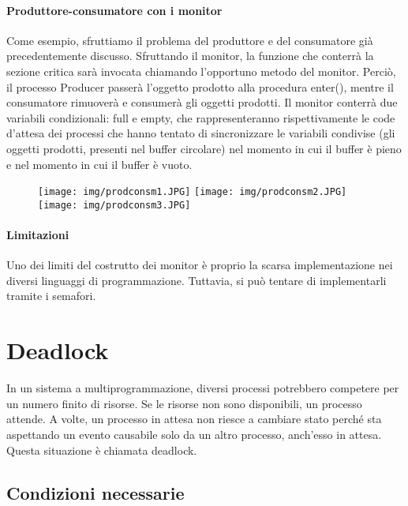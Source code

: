 \documentclass[a4]{article}
\begin{document}
\paragraph{Produttore-consumatore con i monitor}
Come esempio, sfruttiamo il problema del produttore e del consumatore già precedentemente discusso. Sfruttando il monitor, la funzione che conterrà la sezione critica sarà invocata chiamando l'opportuno metodo del monitor. Perciò, il processo Producer passerà l'oggetto prodotto alla procedura enter(), mentre il consumatore rimuoverà e consumerà gli oggetti prodotti.\newline
Il monitor conterrà due variabili condizionali: full e empty, che rappresenteranno rispettivamente le code d'attesa dei processi che hanno tentato di sincronizzare le variabili condivise (gli oggetti prodotti, presenti nel buffer circolare) nel momento in cui il buffer è pieno e nel momento in cui il buffer è vuoto.
\begin{figure}[h!]
    \texttt{[image: img/prodconsm1.JPG]}
    \texttt{[image: img/prodconsm2.JPG]}
    \texttt{[image: img/prodconsm3.JPG]}
\end{figure}

\paragraph{Limitazioni}
Uno dei limiti del costrutto dei monitor è proprio la scarsa implementazione nei diversi linguaggi di programmazione. Tuttavia, si può tentare di implementarli tramite i semafori.


\section{Deadlock}
In un sistema a multiprogrammazione, diversi processi potrebbero competere per un numero finito di risorse. Se le risorse non sono disponibili, un processo attende. A volte, un processo in attesa non riesce a cambiare stato perché sta aspettando un evento causabile solo da un altro processo, anch'esso in attesa. Questa situazione è chiamata deadlock.

\subsection{Condizioni necessarie}
\end{document}
